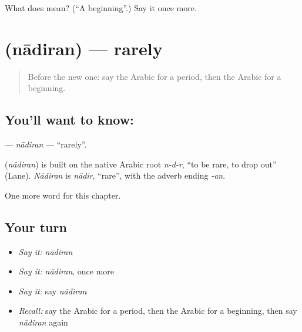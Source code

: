 \begin{tcolorbox}[breakable,colback=teal!4,colframe=teal!35!black,title={Before you move on}]
What does  mean? (\textquotedblleft{}A beginning\textquotedblright{}.) Say it once more.
\end{tcolorbox}
\section[\texorpdfstring{\ar{نادرا} (nādiran)}{نادرا (nādiran)}]{ (nādiran) — rarely}

\label{lesson:AR-C171-nadiran}



\begin{quote}
Before the new one: say the Arabic for a period, then the Arabic for a beginning.
\end{quote}

\subsection*{You'll want to know: }
\textbf{} — \emph{nādiran} — \textquotedblleft{}rarely\textquotedblright{}.

\begin{cousinweb}
\textbf{} (\emph{nādiran}) is built on the native Arabic root \emph{n-d-r}, \textquotedblleft{}to be rare, to drop out\textquotedblright{} (Lane). \emph{Nādiran} is \emph{nādir}, \textquotedblleft{}rare\textquotedblright{}, with the adverb ending \emph{-an}.
\end{cousinweb}

\begin{grammarlens}[title={What you've built}]
One more word for this chapter.
\end{grammarlens}

\subsection*{Your turn}
\begin{itemize}
\raggedright
  \item \emph{Say it:} \emph{nādiran}
  \item \emph{Say it:} \emph{nādiran}, once more
  \item \emph{Say it:} say \emph{nādiran}
  \item \emph{Recall:} say the Arabic for a period, then the Arabic for a beginning, then say \emph{nādiran} again
\end{itemize}

